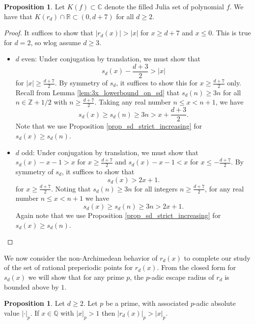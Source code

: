 \documentclass[12pt]{amsart}
\theoremstyle{definition}
\newtheorem{proposition}[theorem]{Proposition}
\begin{document}
\begin{proposition}
    Let $K(f)\subset \mathbb{C}$ denote the filled Julia set of polynomial $f$. We have that $K(r_d)\cap \mathbb{R} \subset (0,d+7)$ for all $d\geq 2$.
    \label{thm:rd_escape_radius}
 \end{proposition}
 \begin{proof}
    It suffices to show that $|r_d(x)| > |x|$ for $x\geq d+7$ and $x\leq 0$. This is true for $d=2$, so wlog assume $d\geq 3$.
    \begin{itemize}
        \item $d$ even: Under conjugation by translation, we must show that
        $$s_d(x) - \frac{d+3}{2} > |x| $$
        for $|x|\geq \frac{d+7}{2}$. By symmetry of $s_d$, it suffices to show this for $x\geq \frac{d+7}{2}$ only. Recall from Lemma \ref{lem:3x_lowerbound_on_sd}  that $s_d(n) \geq 3n$ for all $n\in \mathbb{Z}+1/2$ with $n\geq \frac{d+7}{2}$. Taking any real number $n\leq x< n+1$, we have 
        $$ s_d(x) \geq s_d(n) 
        \geq 3n 
        > x + \frac{d+3}{2}. $$
        Note that we use Proposition \ref{prop_sd_strict_increasing} for $s_d(x)\geq s_d(n)$.
        
        \item $d$ odd: Under conjugation by translation, we must show that $ s_d(x) - x-1 > x $ for $x \geq \frac{d+7}{2}$ and $ s_d(x)-x-1 < x $ for $x\leq -\frac{d+7}{2}$. By symmetry of $s_d$, it suffices to show that
        $$ s_d(x) > 2x + 1. $$
        for $x \geq \frac{d+7}{2}$. Noting that $s_d(n) \geq 3n$ for all integers $n \geq \frac{d+7}{2}$, for any real number $n\leq x < n+1$ we have
        $$ s_d(x) \geq s_d(n) \geq 3n > 2x+1. $$
        Again note that we use Proposition \ref{prop_sd_strict_increasing} for $s_d(x)\geq s_d(n)$.	 		
        
        
    \end{itemize}
 \end{proof}

 We now consider the non-Archimedean behavior of $r_d(x)$ to complete our study of the set of rational preperiodic points for $r_d(x)$.  From the closed form for $s_d(x)$ we will show that for any prime $p$, the $p$-adic escape radius of $r_d$ is bounded above by $1$.

 \begin{proposition} Let $d \geq 2$. Let $p$ be a prime, with associated $p$-adic absolute value $|\cdot|_p$.  If $x \in \mathbb{Q}$ with $|x|_p > 1$ then $|r_d(x)|_p > |x|_p$.
 \end{proposition}
\end{document}
